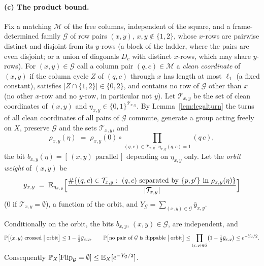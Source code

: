 \paragraph{(c) The product bound.}  Fix a matching $\mathcal M$ of the
free columns, independent of the square, and a frame-determined family
$\mathcal G$ of row pairs $(x,y)$, $x,y\notin\{1,2\}$, whose
$x$-rows are pairwise distinct and disjoint from its $y$-rows (a block
of the ladder, where the pairs are even disjoint; or a union of
diagonals $D_c$ with distinct $x$-rows, which may share $y$-rows).
For $(x,y)\in\mathcal G$ call a column pair $(q,c)\in\mathcal M$ a
\emph{clean coordinate} of $(x,y)$ if the column cycle $Z$ of $(q,c)$
through $x$ has length at most $\ell_1$ (a fixed constant), satisfies
$|Z\cap\{1,2\}|\in\{0,2\}$, and contains no row of $\mathcal G$
other than $x$ (no other $x$-row and no $y$-row, in particular not
$y$).  Let $\mathcal T_{x,y}$ be the set of clean coordinates of
$(x,y)$ and $\eta_{x,y}\in\{0,1\}^{\mathcal T_{x,y}}$.  By
Lemma~\ref{lem:legalturn} the turns of all clean coordinates of all
pairs of $\mathcal G$ commute, generate a group acting freely on $X$,
preserve $\mathcal G$ and the sets $\mathcal T_{x,y}$, and
\[
\rho_{x,y}(\eta)\;=\;\rho_{x,y}(0)\circ\!\!\prod_{(q,c)\in\mathcal T_{x,y}:\ \eta_{x,y}(q,c)=1}\!\!(q\,c),
\]
the bit $b_{x,y}(\eta)=[\,(x,y)\text{ parallel}\,]$ depending on
$\eta_{x,y}$ only.  Let the \emph{orbit weight} of $(x,y)$ be
\[
\bar y_{x,y}\;=\;\E_{\eta_{x,y}}\Bigl[\frac{\#\{(q,c)\in\mathcal T_{x,y}:\ (q,c)\text{ separated by }\{p,p'\}\text{ in }\rho_{x,y}(\eta)\}}{|\mathcal T_{x,y}|}\Bigr]
\]
($0$ if $\mathcal T_{x,y}=\emptyset$), a function of the orbit, and
$Y_{\mathcal G}=\sum_{(x,y)\in\mathcal G}\bar y_{x,y}$.

\begin{proposition}\label{prop:orbit}
Conditionally on the orbit, the bits $b_{x,y}$, $(x,y)\in\mathcal G$,
are independent, and
\[
\Pr\bigl[(x,y)\text{ crossed}\bigm|\text{orbit}\bigr]\le1-\tfrac12\bar y_{x,y},
\qquad
\Pr\bigl[\text{no pair of }\mathcal G\text{ is flippable}\bigm|\text{orbit}\bigr]
\le\prod_{(x,y)\in\mathcal G}\bigl(1-\tfrac12\bar y_{x,y}\bigr)\le e^{-Y_{\mathcal G}/2}.
\]
Consequently $\Pr_X[\mathrm{Flip}_{\mathcal G}=\emptyset]\le\E_X[e^{-Y_{\mathcal G}/2}]$.
\end{proposition}

